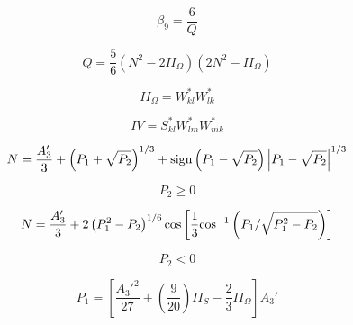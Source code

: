 {\newpage\clearpage
{}%
\begin{displaymath}
\beta_9 = \frac{6}{Q}
\end{displaymath}%
\lthtmldisplayZ
\lthtmlcheckvsize\clearpage}

{\newpage\clearpage
{}%
\begin{displaymath}
Q = \frac{5}{6} \left( N^2 - 2 II_{\Omega} \right) \left( 2 N^2 - II_{\Omega} \right)
\end{displaymath}%
\lthtmldisplayZ
\lthtmlcheckvsize\clearpage}

{\newpage\clearpage
{}%
\begin{displaymath}
II_{\Omega} = W_{kl}^*W_{lk}^*
\end{displaymath}%
\lthtmldisplayZ
\lthtmlcheckvsize\clearpage}

{\newpage\clearpage
{}%
\begin{displaymath}
IV = S_{kl}^*W_{lm}^*W_{mk}^*
\end{displaymath}%
\lthtmldisplayZ
\lthtmlcheckvsize\clearpage}

{\newpage\clearpage
{}%
\begin{displaymath}
N = \frac{A_3'}{3} + \left( P_1 + \sqrt{P_2} \right)^{1/3} + {\rm sign}
   \left( P_1 - \sqrt{P_2} \right) \left| P_1 - \sqrt{P_2} \right|^{1/3}
\end{displaymath}%
\lthtmldisplayZ
\lthtmlcheckvsize\clearpage}

{\newpage\clearpage
{}%
\begin{displaymath}
P_2 \geq 0
\end{displaymath}%
\lthtmldisplayZ
\lthtmlcheckvsize\clearpage}

{\newpage\clearpage
{}%
\begin{displaymath}
N = \frac{A_3'}{3} + 2\left( P_1^2 - P_2 \right)^{1/6}
   {\rm cos} \left[ \frac{1}{3} {\rm cos}^{-1} \left( P_1 / \sqrt{ P_1^2 - P_2} \right) \right]
\end{displaymath}%
\lthtmldisplayZ
\lthtmlcheckvsize\clearpage}

{\newpage\clearpage
{}%
\begin{displaymath}
P_2 < 0
\end{displaymath}%
\lthtmldisplayZ
\lthtmlcheckvsize\clearpage}

{\newpage\clearpage
{}%
\begin{displaymath}
P_1 = \left[ \frac{A_3'^2}{27} + \left( \frac{9}{20} \right) II_{S} - \frac{2}{3} II_{\Omega} \right] A_3'
\end{displaymath}%
\lthtmldisplayZ
\lthtmlcheckvsize\clearpage}

